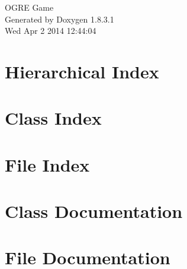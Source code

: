\documentclass{book}
\begin{document}
\hypersetup{pageanchor=false,citecolor=blue}
\begin{titlepage}
\vspace*{7cm}
\begin{center}
{\Large O\-G\-R\-E Game }\\
\vspace*{1cm}
{\large Generated by Doxygen 1.8.3.1}\\
\vspace*{0.5cm}
{\small Wed Apr 2 2014 12:44:04}\\
\end{center}
\end{titlepage}
\clearemptydoublepage
{}
\tableofcontents
\clearemptydoublepage
{}
\hypersetup{pageanchor=true,citecolor=blue}
\chapter{Hierarchical Index}

\chapter{Class Index}

\chapter{File Index}

\chapter{Class Documentation}
















\chapter{File Documentation}






















\printindex
\end{document}
